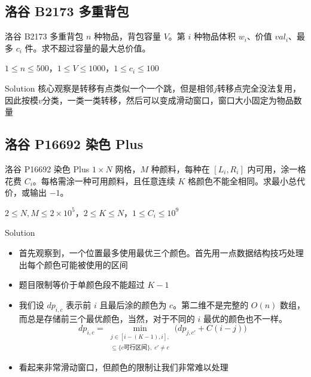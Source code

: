 ﻿\documentclass[aspectratio=169]{ctexbeamer}
\begin{document}
\subsection{洛谷 B2173 多重背包}
\begin{frame}{洛谷 B2173 多重背包}
      $n$ 种物品，背包容量 $V$。第 $i$ 种物品体积 $w_i$、价值 $val_i$、最多 $c_i$ 件。求不超过容量的最大总价值。
      
      $1\le n\le 500$，$1\le V\le 1000$，$1\le c_i\le 100$
\end{frame}

\begin{frame}{Solution}
    核心观察是转移有点类似一个一个跳，但是相邻$j$转移点完全没法复用，因此按模$v$分类，一类一类转移，然后可以变成滑动窗口，窗口大小固定为物品数量
\end{frame}


\subsection{洛谷 P16692 染色 Plus}

\begin{frame}{洛谷 P16692 染色 Plus}
      $1\times N$ 网格，$M$ 种颜料，每种在 $[L_i,R_i]$ 内可用，涂一格花费 $C_i$。每格需涂一种可用颜料，且任意连续 $K$ 格颜色不能全相同。求最小总代价，或输出 $-1$。
      
      $2\le N,M\le 2\times 10^5$，$2\le K\le N$，$1\le C_i\le 10^9$
\end{frame}

\begin{frame}{Solution}
    \begin{itemize}
        \item 首先观察到，一个位置最多使用最优三个颜色。首先用一点数据结构技巧处理出每个颜色可能被使用的区间
        \item 题目限制等价于单颜色段不能超过 $ K-1 $
        \item 我们设 $dp_{i,c}$ 表示前 $ i $ 且最后涂的颜色为 $ c $。第二维不是完整的 $O(n)$ 数组，而总是存储前三个最优颜色，当然，对于不同的 $i$ 最优的颜色也不一样。
        $$
            dp_{i,c}=\min_{\substack{j\in [i-(K-1),i],\\ [j+1,i]\subseteq \{c\text{可行区间}\},\;c'\neq c}}
            \bigl(dp_{j,c'}+C(i-j)\bigr)
        $$
        \item 看起来非常滑动窗口，但颜色的限制让我们非常难以处理
    \end{itemize}
\end{frame}
\end{document}
